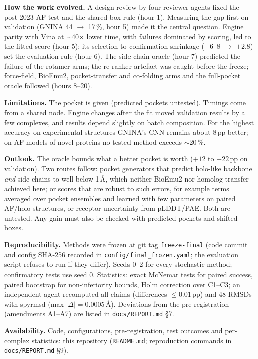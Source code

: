 \documentclass[10pt,a4paper,twocolumn]{article}
\newcommand{\file}[1]{\texttt{\footnotesize #1}}
\newcommand{\pp}{\,pp}
\begin{document}
\textbf{How the work evolved.} A design review by four reviewer agents fixed the post-2023 AF test and the shared box
rule (hour 1). Measuring the gap first on validation (GNINA 44 $\to$ 17\,\%, hour 5) made it the central question.
Engine parity with Vina at $\sim$40$\times$ lower time, with failures dominated by scoring, led to the fitted score
(hour 5); its selection-to-confirmation shrinkage ($+6$--8 $\to$ $+2.8$) set the evaluation rule (hour 6). The
side-chain oracle (hour 7) predicted the failure of the rotamer arms; the re-ranker artefact was caught before the
freeze; force-field, BioEmu2, pocket-transfer and co-folding arms and the full-pocket oracle followed (hours 8--20).

\textbf{Limitations.} The pocket is given (predicted pockets untested). Timings come from a shared node. Engine
changes after the fit moved validation results by a few complexes, and results depend slightly on batch composition.
For the highest accuracy on experimental structures GNINA's CNN remains about 8\pp{} better; on AF models of novel
proteins no tested method exceeds $\sim$20\,\%.

\textbf{Outlook.} The oracle bounds what a better pocket is worth ($+12$ to $+22$\pp{} on validation). Two routes
follow: pocket generators that predict holo-like backbone \emph{and} side chains to well below 1\,\AA{}, which
neither BioEmu2 nor homolog transfer achieved here; or scores that are robust to such errors, for example terms averaged
over pocket ensembles and learned with few parameters on paired AF/holo structures, or receptor uncertainty from
pLDDT/PAE. Both are untested. Any gain must also be checked with predicted pockets and shifted boxes.

\textbf{Reproducibility.} Methods were frozen at git tag \texttt{freeze-final} (code commit and config SHA-256
recorded in \file{config/final\_frozen.yaml}; the evaluation script refuses to run if they differ). Seeds 0--2 for
every stochastic method; confirmatory tests use seed 0. Statistics: exact McNemar tests for paired success,
paired bootstrap for non-inferiority bounds, Holm correction over C1--C3; an independent agent recomputed all claims
(differences $\leq 0.01$\pp) and 48 RMSDs with spyrmsd (max $|\Delta| = 0.0005$\,\AA). Deviations from the
pre-registration (amendments A1--A7) are listed in \file{docs/REPORT.md} \S7.

\textbf{Availability.} Code, configurations, pre-registration, test outcomes and per-complex statistics:
this repository (\file{README.md}; reproduction commands in \file{docs/REPORT.md} \S9).
\end{document}
